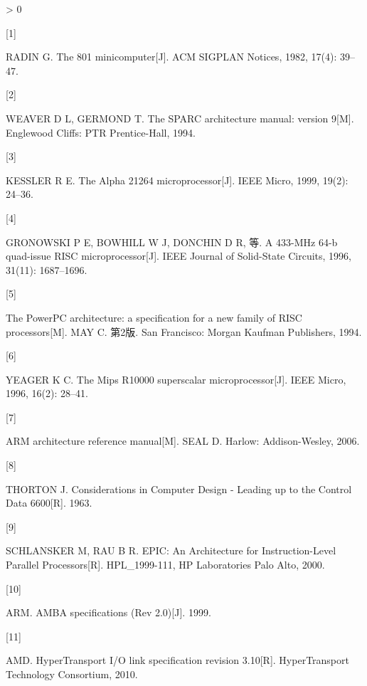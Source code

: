 \documentclass[]{ctexbook}
\newlength{\cslhangindent}
\newlength{\csllabelwidth}
\newenvironment{CSLReferences}[3] %
 {%
  \setlength{\parindent}{0pt}
  \ifodd #1 \everypar{\setlength{\hangindent}{\cslhangindent}}\ignorespaces\fi
  \ifnum #2 > 0
  \setlength{\parskip}{#3\baselineskip}
  \fi
 }%
 {}
\newcommand{\CSLLeftMargin}[1]{\parbox[t]{\maxof{\widthof{#1}}{\csllabelwidth}}{#1}}
\newcommand{\CSLRightInline}[1]{\parbox[t]{\linewidth}{#1}}
\begin{document}
\hypertarget{refs}{}
\begin{CSLReferences}{0}{0}
\leavevmode\hypertarget{ref-radin_801_1982}{}%
\CSLLeftMargin{{[}1{]} }
\CSLRightInline{RADIN G. The 801 minicomputer{[}J{]}. ACM SIGPLAN Notices, 1982, 17(4): 39--47.}

\leavevmode\hypertarget{ref-weaver_sparc_1994}{}%
\CSLLeftMargin{{[}2{]} }
\CSLRightInline{WEAVER D L, GERMOND T. The {SPARC} architecture manual: version 9{[}M{]}. Englewood Cliffs: PTR Prentice-Hall, 1994.}

\leavevmode\hypertarget{ref-kessler_alpha_1999}{}%
\CSLLeftMargin{{[}3{]} }
\CSLRightInline{KESSLER R E. The {Alpha} 21264 microprocessor{[}J{]}. IEEE Micro, 1999, 19(2): 24--36.}

\leavevmode\hypertarget{ref-gronowski_433-mhz_1996}{}%
\CSLLeftMargin{{[}4{]} }
\CSLRightInline{GRONOWSKI P E, BOWHILL W J, DONCHIN D R, 等. A 433-{MHz} 64-b quad-issue {RISC} microprocessor{[}J{]}. IEEE Journal of Solid-State Circuits, 1996, 31(11): 1687--1696.}

\leavevmode\hypertarget{ref-may_powerpc_1994}{}%
\CSLLeftMargin{{[}5{]} }
\CSLRightInline{The {PowerPC} architecture: a specification for a new family of {RISC} processors{[}M{]}. MAY C. 第2版. San Francisco: Morgan Kaufman Publishers, 1994.}

\leavevmode\hypertarget{ref-yeager_mips_1996}{}%
\CSLLeftMargin{{[}6{]} }
\CSLRightInline{YEAGER K C. The {Mips} {R10000} superscalar microprocessor{[}J{]}. IEEE Micro, 1996, 16(2): 28--41.}

\leavevmode\hypertarget{ref-seal_arm_2006}{}%
\CSLLeftMargin{{[}7{]} }
\CSLRightInline{{ARM} architecture reference manual{[}M{]}. SEAL D. Harlow: Addison-Wesley, 2006.}

\leavevmode\hypertarget{ref-thorton_considerations_1963}{}%
\CSLLeftMargin{{[}8{]} }
\CSLRightInline{THORTON J. Considerations in {Computer} {Design} - {Leading} up to the {Control} {Data} 6600{[}R{]}. 1963.}

\leavevmode\hypertarget{ref-schlansker_michael_epic_2000}{}%
\CSLLeftMargin{{[}9{]} }
\CSLRightInline{SCHLANSKER M, RAU B R. {EPIC}: {An} {Architecture} for {Instruction}-{Level} {Parallel} {Processors}{[}R{]}. HPL\_1999-111, HP Laboratories Palo Alto, 2000.}

\leavevmode\hypertarget{ref-arm_amba_1999}{}%
\CSLLeftMargin{{[}10{]} }
\CSLRightInline{ARM. {AMBA} specifications ({Rev} 2.0){[}J{]}. 1999.}

\leavevmode\hypertarget{ref-amd_hypertransport_2010}{}%
\CSLLeftMargin{{[}11{]} }
\CSLRightInline{AMD. {HyperTransport} {I}/{O} link specification revision 3.10{[}R{]}. HyperTransport Technology Consortium, 2010.}


\end{CSLReferences}
\end{document}
